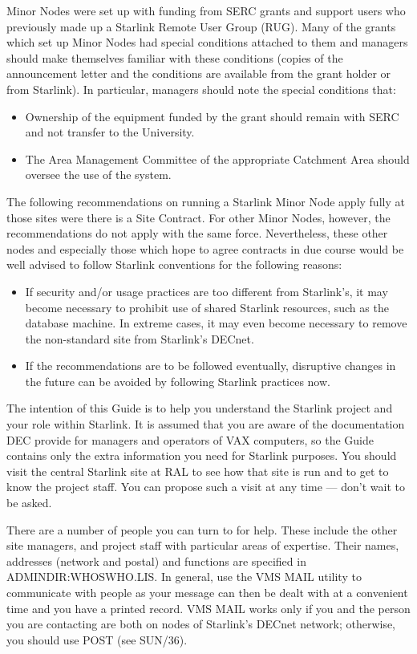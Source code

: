 Minor Nodes were set up with funding from SERC grants and support users who
previously made up a Starlink Remote User Group (RUG).
Many of the grants which set up Minor Nodes had special conditions attached
to them and managers should make themselves familiar with these conditions
(copies of the announcement letter and the conditions are available from
the grant holder or from Starlink).
In particular, managers should note the special conditions that:
\begin{itemize}
\item Ownership of the equipment funded by the grant should remain with SERC
and not transfer to the University.
\item The Area Management Committee of the appropriate Catchment Area should
oversee the use of the system.
\end{itemize}

The following recommendations on running a Starlink Minor Node apply fully
at those sites were there is a Site Contract.
For other Minor Nodes, however, the recommendations do not apply with the same
force.
Nevertheless, these other nodes and especially those which hope to agree
contracts in due course would be well advised to follow Starlink conventions
for the following reasons:
\begin{itemize}
\item If security and/or usage practices are too different from Starlink's,
it may become necessary to prohibit use of shared Starlink resources,
such as the database machine.
In extreme cases, it may even become necessary to remove the non-standard site
from Starlink's DECnet.
\item If the recommendations are to be followed eventually, disruptive changes
in the future can be avoided by following Starlink practices now.
\end{itemize}
The intention of this Guide is to help you understand the Starlink project and
your role within Starlink.
It is assumed that you are aware of the documentation DEC provide for managers
and operators of VAX computers, so the Guide contains only the extra information
you need for Starlink purposes.
You should visit the central Starlink site at RAL to see how that site is
run and to get to know the project staff.
You can propose such a visit at any time --- don't wait to be asked.

There are a number of people you can turn to for help.
These include the other site managers, and project staff with particular areas
of expertise.
Their names, addresses (network and postal) and functions are specified in
ADMINDIR:WHOSWHO.LIS.
In general, use the VMS MAIL utility to communicate with people as your message
can then be dealt with at a convenient time and you have a printed record.
VMS MAIL works only if you and the person you are contacting are both on nodes
of Starlink's DECnet network; otherwise, you should use POST (see SUN/36).

